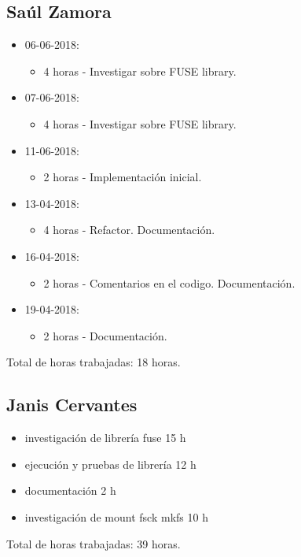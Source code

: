 \documentclass{article}
\begin{document}
\subsection{Sa\'ul Zamora}
\begin{itemize}
  \item 06-06-2018:
  \begin{itemize}
    \item 4 horas - Investigar sobre FUSE library.
  \end{itemize}
  \item 07-06-2018:
  \begin{itemize}
    \item 4 horas - Investigar sobre FUSE library.
  \end{itemize}
  \item 11-06-2018:
  \begin{itemize}
    \item 2 horas - Implementaci\'on inicial.
  \end{itemize}
  \item 13-04-2018:
  \begin{itemize}
    \item 4 horas - Refactor. Documentaci\'on.
  \end{itemize}
  \item 16-04-2018:
  \begin{itemize}
    \item 2 horas - Comentarios en el codigo. Documentaci\'on.
  \end{itemize}
  \item 19-04-2018:
  \begin{itemize}
    \item 2 horas - Documentaci\'on.
  \end{itemize}
\end{itemize}
Total de horas trabajadas: 18 horas.

\subsection{Janis Cervantes}
\begin{itemize}
  \item investigación de librería fuse 15 h
  \item ejecución y pruebas de librería 12 h
  \item documentación 2 h
  \item investigación de mount fsck mkfs 10 h
\end{itemize}
Total de horas trabajadas: 39 horas.
\end{document}
